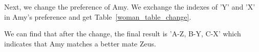 {Next, we change the preference of Amy. We exchange the indexes of 'Y' and 'X' in Amy's preference and get Table~\ref{woman_table_change}.
\begin{table}[H]
\caption{Women's preference table(changed)}
\label{woman_table_change}
\centering
{}
\end{table}

We can find that after the change, the final result is 'A-Z, B-Y, C-X' which indicates that Amy matches a better mate Zeus.

}
